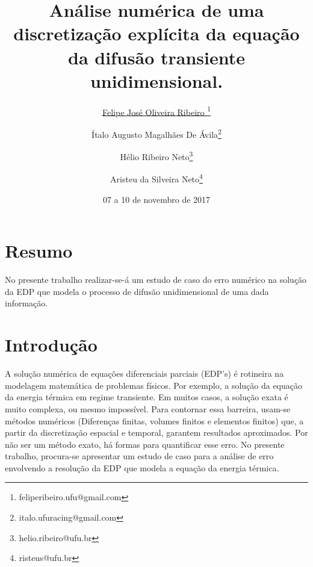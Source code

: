 \documentclass[10pt,twoside,a4paper]{article}
\date{07 a 10 de novembro de 2017}
\title{Análise numérica de uma discretização explícita da equação da difusão transiente unidimensional.}
\author[1]{\underline{Felipe José Oliveira Ribeiro }\thanks{feliperibeiro.ufu@gmail.com}}
\author[1]{Ítalo Augusto Magalhães De Ávila\thanks{italo.ufuracing@gmail.com}}
\author[1]{Hélio Ribeiro Neto\thanks{helio.ribeiro@ufu.br}}
\author[1]{Aristeu da Silveira Neto\thanks{risteus@ufu.br}}
\affil[1]{FEMEC - Universidade Federal de Uberlândia}
\begin{document}
\inserirtitulo
\linespread{1.5}%

\section{Resumo}
No presente trabalho realizar-se-á um estudo de caso do erro numérico na solução da EDP que modela o processo de difusão unidimensional de uma dada informação. 


\section{Introdução} %

A solução numérica de equações diferenciais parciais (EDP’s) é rotineira na modelagem matemática de problemas físicos. Por exemplo, a solução da equação da energia térmica em regime transiente. Em muitos casos, a solução exata é muito complexa, ou mesmo impossível. Para contornar essa barreira, usam-se métodos numéricos (Diferenças finitas, volumes finitos e elementos finitos) que, a partir da discretização espacial e temporal, garantem resultados aproximados. Por não ser um método exato, há formas para quantificar esse erro. No presente trabalho, procura-se apresentar um estudo de caso para a análise de erro envolvendo a resolução da EDP que modela a equação da energia térmica. 

\end{document}
